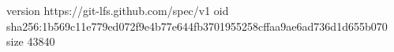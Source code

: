 version https://git-lfs.github.com/spec/v1
oid sha256:1b569c11e779ed072f9e4b77e644fb3701955258cffaa9ae6ad736d1d655b070
size 43840
